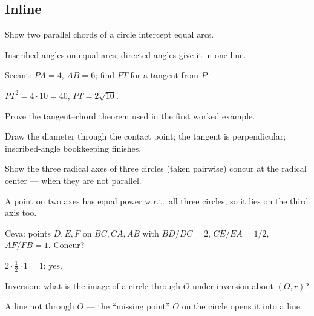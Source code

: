 \subsection*{Inline}
\begin{exercise}[easy]\label{exr:g1}
Show two parallel chords of a circle intercept equal arcs.
\end{exercise}
\begin{solution}
Inscribed angles on equal arcs; directed angles give it in one line.
\end{solution}
\begin{exercise}[easy]\label{exr:g2}
Secant: $PA=4$, $AB=6$; find $PT$ for a tangent from $P$.
\end{exercise}
\begin{solution}
$PT^2 = 4\cdot10 = 40$, $PT=2\sqrt{10}$.
\end{solution}
\begin{exercise}[medium]\label{exr:g3}
Prove the tangent--chord theorem used in the first worked example.
\end{exercise}
\begin{solution}
Draw the diameter through the contact point; the tangent is
perpendicular; inscribed-angle bookkeeping finishes.
\end{solution}
\begin{exercise}[medium]\label{exr:g4}
Show the three radical axes of three circles (taken pairwise) concur at
the radical center --- when they are not parallel.
\end{exercise}
\begin{solution}
A point on two axes has equal power w.r.t.\ all three circles, so it
lies on the third axis too.
\end{solution}
\begin{exercise}[medium]\label{exr:g5}
Ceva: points $D,E,F$ on $BC,CA,AB$ with $BD/DC=2$, $CE/EA=1/2$,
$AF/FB=1$. Concur?
\end{exercise}
\begin{solution}
$2\cdot\tfrac12\cdot1 = 1$: yes.
\end{solution}
\begin{exercise}[medium]\label{exr:g6}
Inversion: what is the image of a circle through $O$ under inversion
about $(O,r)$?
\end{exercise}
\begin{solution}
A line not through $O$ --- the ``missing point'' $O$ on the circle
opens it into a line.
\end{solution}
